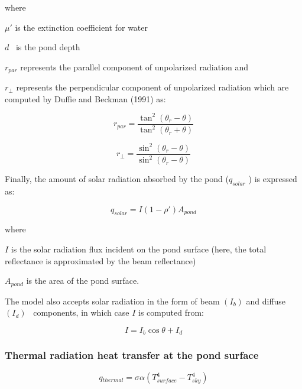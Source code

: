 where

\(\mu '\) is the extinction coefficient for water

\(d\) ~is the pond depth

\({r_{par}}\) represents the parallel component of unpolarized radiation and

\({r_ \bot }\) represents the perpendicular component of unpolarized radiation which are computed by Duffie and Beckman (1991) as:

\begin{equation}
  r_{par} = \frac{\tan ^2 \left( \theta_r - \theta \right)}{\tan ^2 \left( \theta_r + \theta \right)}
\end{equation}

\begin{equation}
  r_{\bot} = \frac{\sin ^2 \left( \theta_r - \theta \right)}{\sin ^2 \left( \theta_r - \theta  \right)}
\end{equation}

Finally, the amount of solar radiation absorbed by the pond (\({q_{solar}}\) ) is expressed as:

\begin{equation}
{q_{solar}} = I\left( {1 - \rho '} \right){A_{pond}}
\end{equation}

where

\(I\) is the solar radiation flux incident on the pond surface (here, the total reflectance is approximated by the beam reflectance)

\({A_{pond}}\) is the area of the pond surface.

The model also accepts solar radiation in the form of beam \(\left( {{I_b}} \right)\) and diffuse \(\left( {{I_d}} \right)\) ~components, in which case \(I\) is computed from:

\begin{equation}
I = {I_b}\cos \theta  + {I_d}
\end{equation}

\subsubsection{Thermal radiation heat transfer at the pond surface}\label{thermal-radiation-heat-transfer-at-the-pond-surface}

\begin{equation}
q{}_{thermal} = \sigma \alpha (T{{}_{surface}^4} - T{{}_{sky}^4})
\end{equation}

